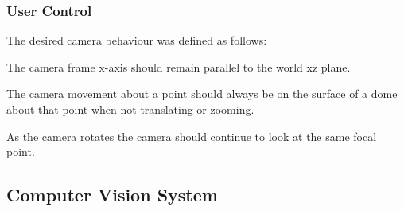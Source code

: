 \subsubsection{User Control}

The desired camera behaviour was defined as follows:

\begin{compactitem}
	\item The camera frame x-axis should remain parallel to the world xz plane.
	\item The camera movement about a point should always be on the surface of a dome about that point when not translating or zooming.
	\item As the camera rotates the camera should continue to look at the same focal point.
\end{compactitem}


\subsection{Computer Vision System}


